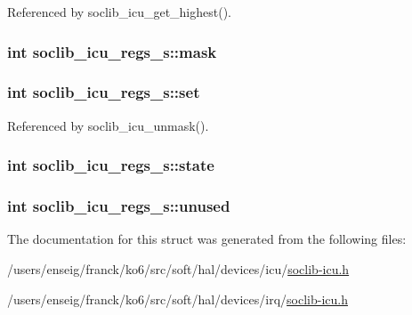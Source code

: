 Referenced by soclib\-\_\-icu\-\_\-get\-\_\-highest().

\hypertarget{structsoclib__icu__regs__s_a441bc8ac5b4fafd3a010fc0407f1d15d}{
\subsubsection[{mask}]{\setlength{\rightskip}{0pt plus 5cm}int soclib\-\_\-icu\-\_\-regs\-\_\-s\-::mask}}\label{structsoclib__icu__regs__s_a441bc8ac5b4fafd3a010fc0407f1d15d}
\hypertarget{structsoclib__icu__regs__s_ac739bbbb3c2ebdd3e56126a8f894809b}{
\subsubsection[{set}]{\setlength{\rightskip}{0pt plus 5cm}int soclib\-\_\-icu\-\_\-regs\-\_\-s\-::set}}\label{structsoclib__icu__regs__s_ac739bbbb3c2ebdd3e56126a8f894809b}


Referenced by soclib\-\_\-icu\-\_\-unmask().

\hypertarget{structsoclib__icu__regs__s_a598718b6403f6a06261e28246093c3c6}{
\subsubsection[{state}]{\setlength{\rightskip}{0pt plus 5cm}int soclib\-\_\-icu\-\_\-regs\-\_\-s\-::state}}\label{structsoclib__icu__regs__s_a598718b6403f6a06261e28246093c3c6}
\hypertarget{structsoclib__icu__regs__s_a45909716b5e6626bb1bbb1b94bb366ed}{
\subsubsection[{unused}]{\setlength{\rightskip}{0pt plus 5cm}int soclib\-\_\-icu\-\_\-regs\-\_\-s\-::unused}}\label{structsoclib__icu__regs__s_a45909716b5e6626bb1bbb1b94bb366ed}


The documentation for this struct was generated from the following files\-:\begin{DoxyCompactItemize}
\item 
/users/enseig/franck/ko6/src/soft/hal/devices/icu/\hyperlink{icu_2soclib-icu_8h}{soclib-\/icu.\-h}\item 
/users/enseig/franck/ko6/src/soft/hal/devices/irq/\hyperlink{irq_2soclib-icu_8h}{soclib-\/icu.\-h}\end{DoxyCompactItemize}
